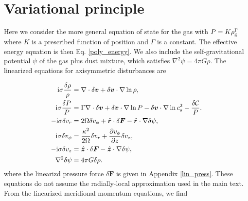 \section{Variational principle}\label{var_prin}

Here we consider the more general equation of state for the gas with
$P = K \rho_\mathrm{g}^{\Gamma}$ where $K$ is a prescribed function of position
and $\Gamma$ is a constant. The effective energy equation is then
Eq. \ref{poly_energy}. We also include the self-gravitational
potential $\psi$ of the gas
plus dust mixture, which satisfies 
$  \nabla^2 \psi  = 4 \pi G \rho. $
The linearized equations for axisymmetric
disturbances are  

\begin{align}
  \mathrm{i}\sigma\frac{\delta\rho}{\rho} &= \nabla\cdot\delta\bm{v} +
  \delta\bm{v}\cdot\nabla\ln{\rho},\label{lin_mass_full}\\
   \mathrm{i}\sigma\frac{\delta P}{P} &= \Gamma \nabla\cdot\delta\bm{v} +
  \delta\bm{v}\cdot\nabla\ln{P} - \delta\bm{v}\cdot\nabla\ln{c_s^2} - \frac{\delta\mathcal{C}}{P}.\label{lin_energy_full}\\
  -\mathrm{i}\sigma\delta v_r  &= 2\Omega\delta v_\phi + 
  \hat{\bm{r}} \cdot \delta\bm{F} -  \hat{\bm{r}} \cdot \nabla\delta\psi ,\\
  \mathrm{i}\sigma\delta v_\phi &= \frac{\kappa^2}{2\Omega}\delta v_r + \frac{\partial
    v_\phi}{\partial z}\delta v_z,\\
  -\mathrm{i}\sigma\delta v_z &=  \hat{\bm{z}} \cdot \delta\bm{F}  -  \hat{\bm{z}} \cdot \nabla\delta\psi, \\ 
\nabla^2 \delta\psi & = 4\pi G \delta\rho. 
\end{align}  
where the linearizd pressure force $\delta \bm{F}$ is given in
Appendix \ref{lin_press}. These equations do not assume the
radially-local approximation used in the main text. From the
linearized meridional momentum equations, we find  


